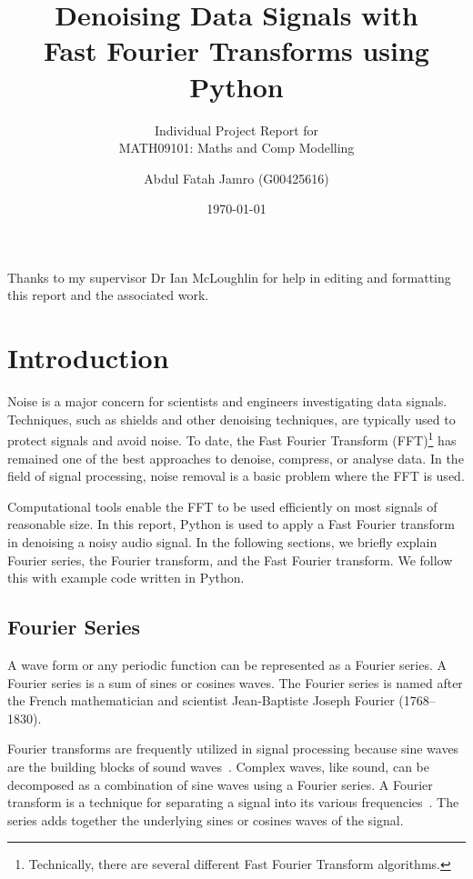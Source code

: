 \documentclass[a4paper, 12pt]{scrartcl}
\title{Denoising Data Signals with\\[2mm] Fast Fourier Transforms using Python}
\subtitle{Individual Project Report for\\[2mm] MATH09101: Maths and Comp Modelling}
\author{Abdul Fatah Jamro {\Large (G00425616})}
\date{\today}
\begin{document}
  
\maketitle

\newpage

\section*{}
Thanks to my supervisor Dr Ian McLoughlin for help in editing and formatting this report and the associated work.

\tableofcontents

\newpage

\section{Introduction}

Noise is a major concern for scientists and engineers investigating data signals.
Techniques, such as shields and other denoising techniques, are typically used to protect signals and avoid noise.
To date, the Fast Fourier Transform (FFT)\footnote{Technically, there are several different Fast Fourier Transform algorithms.} has remained one of the best approaches to denoise, compress, or analyse data.
In the field of signal processing, noise removal is a basic problem where the FFT is used.

Computational tools enable the FFT to be used efficiently on most signals of reasonable size.
In this report, Python is used to apply a Fast Fourier transform in denoising a noisy audio signal.
In the following sections, we briefly explain Fourier series, the Fourier transform, and the Fast Fourier transform.
We follow this with example code written in Python. 

\subsection{Fourier Series}
A wave form or any periodic function can be represented as a Fourier series.
A Fourier series is a sum of sines or cosines waves.
The Fourier series is named after the French mathematician and scientist Jean-Baptiste Joseph Fourier (1768--1830).

Fourier transforms are frequently utilized in signal processing because sine waves are the building blocks of sound waves~\cite{tolstov1976fourier}.
Complex waves, like sound, can be decomposed as a combination of sine waves using a Fourier series.
A Fourier transform is a technique for separating a signal into its various frequencies~\cite{tolstov1976fourier}.
The series adds together the underlying sines or cosines waves of the signal.
\end{document}
